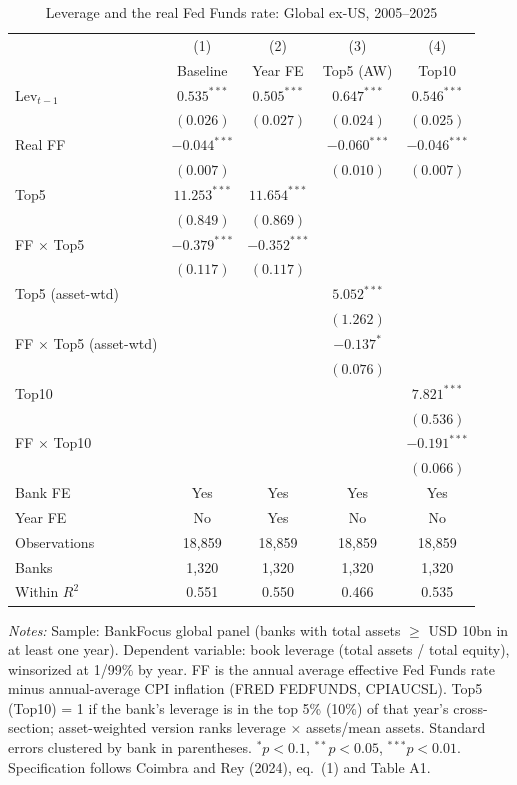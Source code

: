 \documentclass[11pt]{article}
\begin{document}
\clearpage

\begin{table}[htbp]
\centering
\small
\begin{threeparttable}
\caption{Leverage and the real Fed Funds rate: Global ex-US, 2005--2025}
\label{tab:cr_eq1_4}
\begin{tabular}{lcccc}
\toprule
 & (1) & (2) & (3) & (4) \\
 & Baseline & Year FE & Top5 (AW) & Top10 \\
\midrule
Lev$_{t-1}$ & $0.535^{***}$ & $0.505^{***}$ & $0.647^{***}$ & $0.546^{***}$ \\
 & $(0.026)$ & $(0.027)$ & $(0.024)$ & $(0.025)$ \\[2pt]
Real FF & $-0.044^{***}$ &  & $-0.060^{***}$ & $-0.046^{***}$ \\
 & $(0.007)$ &  & $(0.010)$ & $(0.007)$ \\[2pt]
Top5 & $11.253^{***}$ & $11.654^{***}$ &  &  \\
 & $(0.849)$ & $(0.869)$ &  &  \\[2pt]
FF $\times$ Top5 & $-0.379^{***}$ & $-0.352^{***}$ &  &  \\
 & $(0.117)$ & $(0.117)$ &  &  \\[2pt]
Top5 (asset-wtd) &  &  & $5.052^{***}$ &  \\
 &  &  & $(1.262)$ &  \\[2pt]
FF $\times$ Top5 (asset-wtd) &  &  & $-0.137^{*}$ &  \\
 &  &  & $(0.076)$ &  \\[2pt]
Top10 &  &  &  & $7.821^{***}$ \\
 &  &  &  & $(0.536)$ \\[2pt]
FF $\times$ Top10 &  &  &  & $-0.191^{***}$ \\
 &  &  &  & $(0.066)$ \\
\midrule
Bank FE & Yes & Yes & Yes & Yes \\
Year FE & No & Yes & No & No \\
Observations & 18,859 & 18,859 & 18,859 & 18,859 \\
Banks & 1,320 & 1,320 & 1,320 & 1,320 \\
Within $R^2$ & 0.551 & 0.550 & 0.466 & 0.535 \\
\bottomrule
\end{tabular}
\begin{tablenotes}[flushleft]
\footnotesize
\item \textit{Notes:} Sample: BankFocus global panel (banks with total assets $\geq$ USD 10bn in at least one year). Dependent variable: book leverage (total assets / total equity), winsorized at 1/99\% by year. FF is the annual average effective Fed Funds rate minus annual-average CPI inflation (FRED FEDFUNDS, CPIAUCSL). Top5 (Top10) = 1 if the bank's leverage is in the top 5\% (10\%) of that year's cross-section; asset-weighted version ranks leverage $\times$ assets/mean assets. Standard errors clustered by bank in parentheses. $^{*}p<0.1$, $^{**}p<0.05$, $^{***}p<0.01$. Specification follows Coimbra and Rey (2024), eq.~(1) and Table A1.
\end{tablenotes}
\end{threeparttable}
\end{table}
\end{document}
